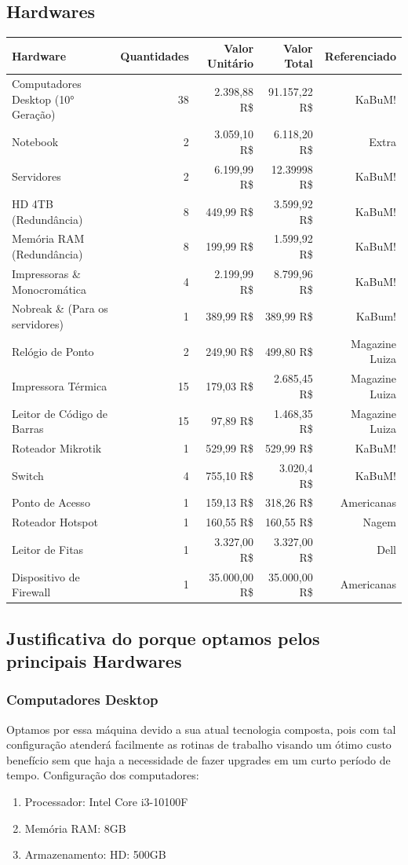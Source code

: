 \documentclass[12pt]{article}
\begin{document}
\subsection{Hardwares}
\begin{center}
\begin{tabular}{| l | r | r | r | r |}
\hline 
Hardware & Quantidades & Valor Unitário & Valor Total & Referenciado\\
\hline
Computadores Desktop (10° Geração) & 38 & 2.398,88 R\$ & 91.157,22 R\$ & KaBuM!\\
Notebook & 2 & 3.059,10 R\$ & 6.118,20 R\$ & Extra\\
Servidores & 2 & 6.199,99 R\$ & 12.39998 R\$ & KaBuM!\\
HD 4TB (Redundância) & 8 & 449,99 R\$ & 3.599,92 R\$ & KaBuM!\\
Memória RAM (Redundância) & 8 & 199,99 R\$ & 1.599,92 R\$ & KaBuM!\\
Impressoras \& Monocromática & 4 & 2.199,99 R\$ & 8.799,96 R\$ & KaBuM!\\
Nobreak \& (Para os servidores) & 1 & 389,99 R\$ & 389,99 R\$ & KaBum!\\
Relógio de Ponto & 2 & 249,90 R\$ & 499,80 R\$ & Magazine Luiza\\ 
Impressora Térmica & 15 & 179,03 R\$ & 2.685,45 R\$ & Magazine Luiza\\
Leitor de Código de Barras & 15 & 97,89 R\$ & 1.468,35 R\$ & Magazine Luiza\\
Roteador Mikrotik & 1 & 529,99 R\$ & 529,99 R\$ & KaBuM!\\
Switch & 4 & 755,10 R\$ & 3.020,4 R\$ & KaBuM!\\
Ponto de Acesso & 1 & 159,13 R\$ & 318,26 R\$ & Americanas\\
Roteador Hotspot & 1 & 160,55 R\$ & 160,55 R\$ & Nagem\\
Leitor de Fitas & 1 & 3.327,00 R\$ & 3.327,00 R\$ & Dell\\
Dispositivo de Firewall & 1 & 35.000,00 R\$ & 35.000,00 R\$ & Americanas\\
\hline
\end{tabular}
\end{center}
\subsection{Justificativa do porque optamos pelos principais Hardwares}
\subsubsection{Computadores Desktop}
Optamos por essa máquina devido a sua atual tecnologia composta, pois com tal configuração atenderá facilmente as rotinas de trabalho visando um ótimo custo benefício sem que haja a necessidade de fazer upgrades em um curto período de tempo. Configuração dos computadores:
\begin{enumerate}
    \item Processador: Intel Core i3-10100F
    \item Memória RAM: 8GB
    \item Armazenamento: HD: 500GB
\end{enumerate}
\end{document}
